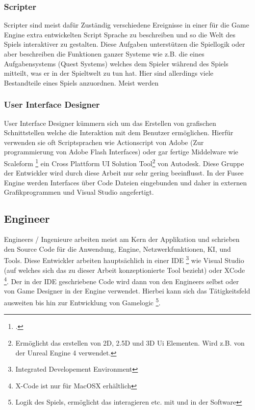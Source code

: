 \documentclass[pagesize, paper=a4, fontsize=12pt,titlepage=true, headings=small, headnosepline, abstractoff, liststotoc, nochapterprefix, plainheadsepline, twoside]{scrreprt}
\begin{document}
\subsubsection{Scripter}
Scripter sind meist dafür Zuständig verschiedene Ereignisse in einer für die Game Engine extra entwickelten Script Sprache zu beschreiben und so die Welt des Spiels interaktiver zu gestalten. Diese Aufgaben unterstützen die Spiellogik oder aber beschreiben die Funktionen ganzer Systeme wie z.B. die eines Aufgabensystems (Quest Systems) welches dem Spieler während des Spiels mitteilt, was er in der Spieltwelt zu tun hat. Hier sind allerdings viele Bestandteile eines Spiels anzuordnen. Meist werden 

\subsubsection{User Interface Designer}
User Interface Designer kümmern sich um das Erstellen von grafischen Schnittstellen welche die Interaktion mit dem Benutzer ermöglichen. Hierfür verwenden sie oft Scriptsprachen wie Actionscript von Adobe (Zur programmierung von Adobe Flash Interfaces) oder gar fertige Middelware wie Scaleform \footcite{AutodeskScale2014} ein Cross Plattform UI Solution Tool\footnote{Ermöglicht das erstellen von 2D, 2.5D und 3D Ui Elementen. Wird z.B. von der Unreal Engine 4 verwendet.} von Autodesk. Diese Gruppe der Entwickler wird durch diese Arbeit nur sehr gering beeinflusst. In der Fusee Engine werden Interfaces über Code Dateien eingebunden und daher in externen Grafikprogrammen und Visual Studio angefertigt.

\subsection{Engineer}
Engineers / Ingenieure arbeiten meist am Kern der Applikation und schrieben den Source Code für die Anwendung, Engine, Netzwerkfunktionen, KI, und Tools. Diese Entwickler arbeiten hauptsächlich in einer IDE \footnote{Integrated Developement Environment} wie Visual Studio (auf welches sich das zu dieser Arbeit konzeptionierte Tool bezieht) oder XCode \footnote{X-Code ist nur für MacOSX erhältlich}. Der in der IDE geschriebene Code wird dann von den Engineers selbst oder von Game Designer in der Engine verwendet. Hierbei kann sich das Tätigkeitsfeld ausweiten bis hin zur Entwicklung von Gamelogic \footnote{Logik des Spiels, ermöglicht das interagieren etc. mit und in der Software}.
\end{document}
